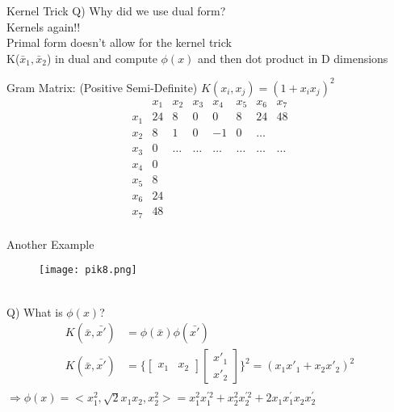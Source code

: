 \documentclass{beamer}
\begin{document}
	\begin{frame}{Kernel Trick}
	   Q) Why did we use dual form? \\
	   \hspace{0.5cm} Kernels again!! \\
	   \vspace{1cm}
	   Primal form doesn't allow for the kernel trick \\
	   K($\bar{x}_{1}, \bar{x}_{2}$) in dual and compute $\phi(x)$ and then dot product in D dimensions
	\end{frame}
	\begin{frame}{Gram Matrix: (Positive Semi-Definite)}
	$K(x_{i}, x_{j}) = (1 + x_{i}x_{j})^{2}$ \\
	$$
	\begin{matrix}
	& x_{1} & x_{2} & x_{3} & x_{4} & x_{5} & x_{6} & x_{7} \\
	x_{1} & 24 & 8 & 0 & 0 & 8 & 24 & 48 \\
	x_{2} & 8 & 1 & 0 & -1 & 0 & \ldots & \\
	x_{3} & 0 & \ldots & \ldots & \ldots & \ldots & \ldots & \ldots \\
	x_{4} & 0 & & & & & & \\
	x_{5} & 8 & & & & & & \\
	x_{6} & 24 & & & & & & \\
	x_{7} & 48 & & & & & & \\
	\end{matrix}
	$$
	\end{frame}
	\begin{frame}{Another Example}
	\vspace{-1cm}
	\hspace{-2cm}
	\begin{minipage}{0.2\textwidth}
    
      \begin{figure}
      
       \texttt{[image: pik8.png]}
      \end{figure}
  \end{minipage} \\
  \vspace{-5cm}
	    Q) What is $\phi(x)$?
	    \begin{align*}
	        K(\bar{x}, \bar{x'}) &= \phi(\bar{x})\phi(\bar{x'}) \\
	        K(\bar{x}, \bar{x'}) &= \bigg\{\begin{bmatrix}x_{1} & x_{2}\end{bmatrix}\begin{bmatrix}x'_{1} \\ x'_{2}\end{bmatrix}\bigg\}^{2} = (x_{1}x'_{1} + x_{2}x'_{2})^{2} \\
	    \end{align*}
	    \vspace{-1.5cm}
	   $\Longrightarrow \phi(x)=<x_{1}^{2}, \sqrt{2} x_{1} x_{2}, x_{2}^{2}>=x_{1}^{2} x_{1}^{\prime 2}+x_{2}^{2} x_{2}^{\prime 2}+2 x_{1} x_{1}^{\prime} x_{2} x_{2}^{\prime}$
	\end{frame}
\end{document}
